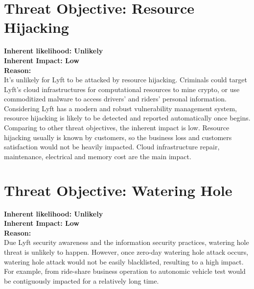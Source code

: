 \documentclass[11pt]{article}
\begin{document}
\section{Threat Objective: Resource Hijacking}


\begin{boxB}
    
    \textbf{Inherent likelihood: Unlikely}\\
    \textbf{Inherent Impact: Low}\\

    \textbf{Reason:}\\

    
    
    It's unlikely for Lyft to be attacked by resource hijacking. Criminals could target Lyft's cloud infrastructures for computational resources to mine crypto, or use commoditized malware to access drivers' and riders' personal information. Considering Lyft has a modern and robust vulnerability management system\cite{Chantavy_2022}, resource hijacking is likely to be detected and reported automatically once begins.\\

    Comparing to other threat objectives, the inherent impact is low. Resource hijacking usually is known by customers, so the business loss and customers satisfaction would not be heavily impacted. Cloud infrastructure repair, maintenance,  electrical and memory cost are the main impact.
    \end{boxB}


\section{Threat Objective: Watering Hole}

\begin{boxB}

    \textbf{Inherent likelihood: Unlikely}\\
    \textbf{Inherent Impact: Low}\\

    \textbf{Reason:}\\

    Due Lyft security awareness and the information security practices, watering hole threat is unlikely to happen. However, once zero-day watering hole attack occurs, watering hole attack would not be easily blacklisted, resulting to a high impact. For example, from ride-share business operation to autonomic vehicle test would be contiguously impacted for a relatively long time.

\end{boxB}
\end{document}

